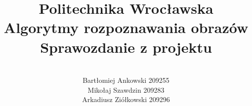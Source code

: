 \documentclass[a4paper,12pt]{article}
\title{\Huge \textbf{Politechnika Wrocławska\\[0.3in]} 
  \huge Algorytmy rozpoznawania obrazów \\[0.2in]
  \LARGE Sprawozdanie z projektu
}
\date{}
\author{
 	\quad	\\
  Bartłomiej Ankowski 209255\\
  Mikołaj Szawdzin 209283\\
  Arkadiusz Ziółkowski 209296\\
}
\begin{document}
\maketitle
\pagebreak

\tableofcontents
\pagebreak






\end{document}
